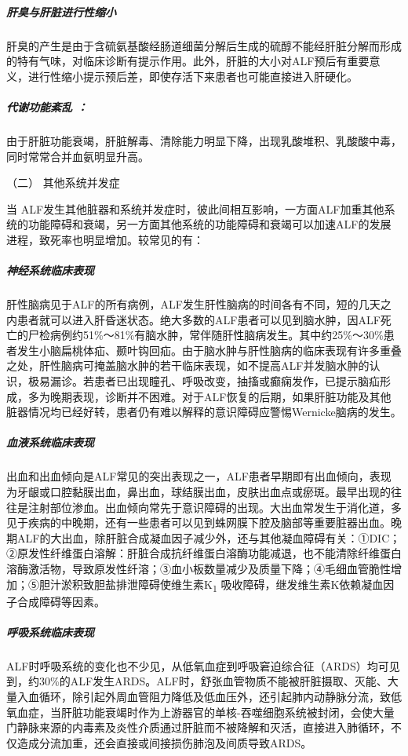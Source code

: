 \subparagraph{肝臭与肝脏进行性缩小}

肝臭的产生是由于含硫氨基酸经肠道细菌分解后生成的硫醇不能经肝脏分解而形成的特有气味，对临床诊断有提示作用。此外，肝脏的大小对ALF预后有重要意义，进行性缩小提示预后差，即使存活下来患者也可能直接进入肝硬化。

\subparagraph{代谢功能紊乱 ：}

由于肝脏功能衰竭，肝脏解毒、清除能力明显下降，出现乳酸堆积、乳酸酸中毒，同时常常合并血氨明显升高。

\hypertarget{text00082.htmlux5cux23CHP3-6-2-2-1-2}{}
（二） 其他系统并发症

当
ALF发生其他脏器和系统并发症时，彼此间相互影响，一方面ALF加重其他系统的功能障碍和衰竭，另一方面其他系统的功能障碍和衰竭可以加速ALF的发展进程，致死率也明显增加。较常见的有：

\subparagraph{神经系统临床表现}

肝性脑病见于ALF的所有病例，ALF发生肝性脑病的时间各有不同，短的几天之内患者就可以进入肝昏迷状态。绝大多数的ALF患者可以见到脑水肿，因ALF死亡的尸检病例约51\%～81\%有脑水肿，常伴随肝性脑病发生。其中约25\%～30\%患者发生小脑扁桃体疝、颞叶钩回疝。由于脑水肿与肝性脑病的临床表现有许多重叠之处，肝性脑病可掩盖脑水肿的若干临床表现，如不提高ALF并发脑水肿的认识，极易漏诊。若患者已出现瞳孔、呼吸改变，抽搐或癫痫发作，已提示脑疝形成，多为晚期表现，诊断并不困难。对于ALF恢复的后期，如果肝脏功能及其他脏器情况均已经好转，患者仍有难以解释的意识障碍应警惕Wernicke脑病的发生。

\subparagraph{血液系统临床表现}

出血和出血倾向是ALF常见的突出表现之一，ALF患者早期即有出血倾向，表现为牙龈或口腔黏膜出血，鼻出血，球结膜出血，皮肤出血点或瘀斑。最早出现的往往是注射部位渗血。出血倾向常先于意识障碍的出现。大出血常发生于消化道，多见于疾病的中晚期，还有一些患者可以见到蛛网膜下腔及脑部等重要脏器出血。晚期ALF的大出血，除肝脏合成凝血因子减少外，还与其他凝血障碍有关：①DIC；②原发性纤维蛋白溶解：肝脏合成抗纤维蛋白溶酶功能减退，也不能清除纤维蛋白溶酶激活物，导致原发性纤溶；③血小板数量减少及质量下降；④毛细血管脆性增加；⑤胆汁淤积致胆盐排泄障碍使维生素K\textsubscript{1}
吸收障碍，继发维生素K依赖凝血因子合成障碍等因素。

\subparagraph{呼吸系统临床表现}

ALF时呼吸系统的变化也不少见，从低氧血症到呼吸窘迫综合征（ARDS）均可见到，约30\%的ALF发生ARDS。ALF时，舒张血管物质不能被肝脏摄取、灭能、大量入血循环，除引起外周血管阻力降低及低血压外，还引起肺内动静脉分流，致低氧血症，当肝脏功能衰竭时作为上游器官的单核-吞噬细胞系统被封闭，会使大量门静脉来源的内毒素及炎性介质通过肝脏而不被降解和灭活，直接进入肺循环，不仅造成分流加重，还会直接或间接损伤肺泡及间质导致ARDS。

